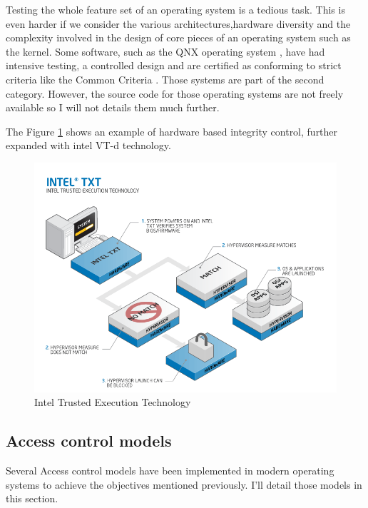 \documentclass[pdftex,a4paper,titlepage,11pt]{article}
\begin{document}
\bigskip

Testing the whole feature set of an operating system is a tedious task. This is
even harder if we consider the various architectures,hardware diversity and the
complexity involved in the design of core pieces of an operating system such as
the kernel. Some software, such as the QNX operating system \cite{QNX}, have had
intensive testing, a controlled design and are certified as conforming to strict
criteria like the Common Criteria \cite{CCCERT}. Those systems are part of the
second category. However, the source code for those operating systems are not
freely available so I will not details them much further.

\bigskip

The Figure \ref{INTELTXT} shows an example of hardware based integrity control,
further expanded with intel VT-d technology.

\begin{figure}[h]
	\centering
	\includegraphics[scale=0.70]{techrefresh-info-txtfull.png}
	\caption{Intel Trusted Execution Technology}
	\label{INTELTXT}
\end{figure}

\subsection{Access control models}

Several Access control models have been implemented in modern operating systems
to achieve the objectives mentioned previously. I'll detail those models in this
section.
\end{document}
